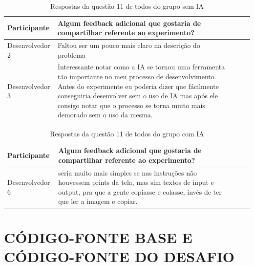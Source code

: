 \documentclass[english,brazilian]{UNISINOSartigo} %
\begin{document}
\begin{table}[ht]
    \caption{Respostas da questão 11 de todos do grupo sem IA}
    \label{tab:questao11_sem_ia}
    \centering%
    \footnotesize
    \begin{tabularx}{\textwidth}{lXXXX}
        \toprule
        \textbf{Participante} & \textbf{Algum feedback adicional que gostaria de compartilhar referente ao experimento?} \\
        \midrule
        Desenvolvedor 2 & Faltou ser um pouco mais claro na descrição do problema \\
        \midrule
        Desenvolvedor 3 & Interessante notar como a IA se tornou uma ferramenta tão importante no meu processo de desenvolvimento. Antes do experimente eu poderia dizer que fácilmente conseguiria desenvolver sem o uso de IA mas após ele consigo notar que o processo se torna muito mais demorado sem o uso da mesma. \\
        \bottomrule
    \end{tabularx}
\end{table}
\FloatBarrier

\begin{table}[ht]
    \caption{Respostas da questão 11 de todos do grupo com IA}
    \label{tab:questao11_com_ia}
    \centering%
    \footnotesize
    \begin{tabularx}{\textwidth}{lXXXX}
        \toprule
        \textbf{Participante} & \textbf{Algum feedback adicional que gostaria de compartilhar referente ao experimento?} \\
        \midrule
        Desenvolvedor 6 & seria muito mais simples se nas instruções não houvessem prints da tela, mas sim textos de input e output, pra que a gente copiasse e colasse, invés de ter que ler a imagem e copiar. \\
        \bottomrule
    \end{tabularx}
\end{table}
\FloatBarrier

\section{CÓDIGO-FONTE BASE E CÓDIGO-FONTE DO DESAFIO}

\renewcommand{\thelstlisting}{G.\arabic{lstlisting}}


\end{document}
